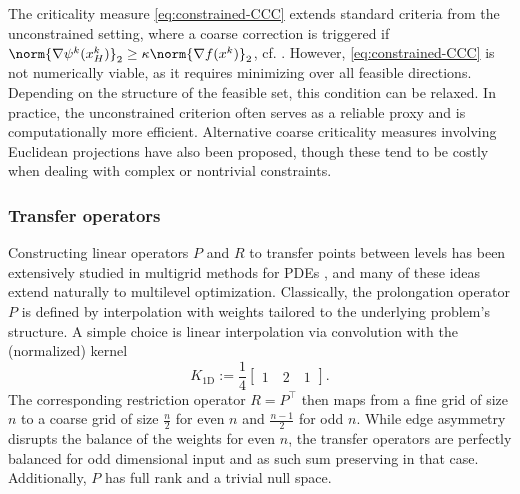 \documentclass[11pt,reqno]{amsart}
\numberwithin{equation}{section}
\numberwithin{figure}{section}
\theoremstyle{plain}
\theoremstyle{definition}
\newcommand{\df}{\nabla f}
\begin{document}
The criticality measure \eqref{eq:constrained-CCC} extends standard criteria from the unconstrained setting, where a coarse correction is triggered if $\norm{\nabla \psi^k(x_H^k)}_2 \geq \kappa  \norm{\df{(x^k)}}_2$, cf. \cite{Gratton:2008}. However, \eqref{eq:constrained-CCC} is not numerically viable, as it requires minimizing over all feasible directions. Depending on the structure of the feasible set, this condition can be relaxed. In practice, the unconstrained criterion often serves as a reliable proxy and is computationally more efficient. Alternative coarse criticality measures involving Euclidean projections have also been proposed, though these tend to be costly when dealing with complex or nontrivial constraints.


\subsubsection{Transfer operators}\label{sec:2l-BPGD-transfer-ops}
Constructing linear operators $P$ and $R$ to transfer points between levels has been extensively studied in multigrid methods for PDEs \cite{Hackbusch:1985,SIAM_Multigrid,Trottenberg:2001}, and many of these ideas extend naturally to multilevel optimization. Classically, the prolongation operator $P$ is defined by interpolation with weights tailored to the underlying problem's structure. A simple choice is linear interpolation via convolution with the (normalized) kernel
\begin{equation} \label{eq:1D-kernel}
    K_{1\text{D}} := \frac{1}{4} \begin{bmatrix} 1 \quad 2 \quad 1 \end{bmatrix}.
\end{equation}
The corresponding restriction operator $R = P^\top$ then maps from a fine grid of size $n$ to a coarse grid of size $\frac{n}{2}$ for even $n$ and $\frac{n-1}{2}$ for odd $n$. While edge asymmetry disrupts the balance of the weights for even $n$, the transfer operators are perfectly balanced for odd dimensional input and as such sum preserving in that case. Additionally, $P$ has full rank and a trivial null space.
\end{document}
